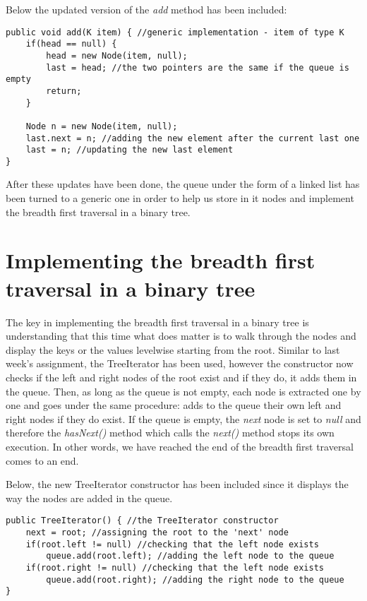 \documentclass[a4paper,11pt]{article}
\begin{document}
Below the updated version of the \textit{add} method has been included: 

\begin{verbatim}
public void add(K item) { //generic implementation - item of type K
    if(head == null) {
        head = new Node(item, null);
        last = head; //the two pointers are the same if the queue is empty
        return;
    }

    Node n = new Node(item, null);
    last.next = n; //adding the new element after the current last one
    last = n; //updating the new last element
}
\end{verbatim}

After these updates have been done, the queue under the form of a linked list has been turned to a generic one in order to help us store in it nodes and implement the breadth first traversal in a binary tree.

\section*{Implementing the breadth first traversal in a binary tree}
The key in implementing the breadth first traversal in a binary tree is understanding that this time what does matter is to walk through the nodes and display the keys or the values levelwise starting from the root. Similar to last week's assignment, the TreeIterator has been used, however the constructor now checks if the left and right nodes of the root exist and if they do, it adds them in the queue.\newline \newline
Then, as long as the queue is not empty, each node is extracted one by one and goes under the same procedure: adds to the queue their own left and right nodes if they do exist. If the queue is empty, the \textit{next} node is set to \textit{null} and therefore the \textit{hasNext()} method which calls the \textit{next()} method stops its own execution. In other words, we have reached the end of the breadth first traversal comes to an end. \newline

Below, the new TreeIterator constructor has been included since it displays the way the nodes are added in the queue.

\begin{verbatim}
public TreeIterator() { //the TreeIterator constructor
    next = root; //assigning the root to the 'next' node
    if(root.left != null) //checking that the left node exists
        queue.add(root.left); //adding the left node to the queue 
    if(root.right != null) //checking that the left node exists
        queue.add(root.right); //adding the right node to the queue 
}
\end{verbatim}
\end{document}
